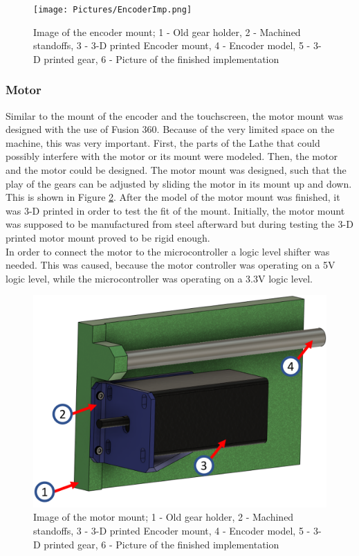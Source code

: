 \begin{figure}
    \begin{center}
    \texttt{[image: Pictures/EncoderImp.png]}
    \caption[Image of the encoder mount]{Image of the encoder mount; 1 - Old gear holder, 2 - Machined standoffs, 3 - 3-D printed Encoder mount, 4 - Encoder model, 5 - 3-D printed gear, 6 - Picture of the finished implementation}
    \label{EncoderImp}
    \end{center}
\end{figure}
 
\subsubsection{Motor}
Similar to the mount of the encoder and the touchscreen, the motor mount was designed with the use of Fusion 360. Because of the very limited space on the machine, this was very important. First, the parts of the Lathe that could possibly interfere with the motor or its mount were modeled. Then, the motor and the motor could be designed. The motor mount was designed, such that the play of the gears can be adjusted by sliding the motor in its mount up and down. This is shown in Figure \ref{MotorImp}. After the model of the motor mount was finished, it was 3-D printed in order to test the fit of the mount. Initially, the motor mount was supposed to be manufactured from steel afterward but during testing the 3-D printed motor mount proved to be rigid enough.\\
In order to connect the motor to the microcontroller a logic level shifter was needed. This was caused, because the motor controller was operating on a 5V logic level, while the microcontroller was operating on a 3.3V logic level.
 
\begin{figure}
    \begin{center}
    \includegraphics[width=12cm]{Pictures/MotorImp.png}
    \caption[Image of the motor mount]{Image of the motor mount; 1 - Old gear holder, 2 - Machined standoffs, 3 - 3-D printed Encoder mount, 4 - Encoder model, 5 - 3-D printed gear, 6 - Picture of the finished implementation}
    \label{MotorImp}
    \end{center}
\end{figure}
 
